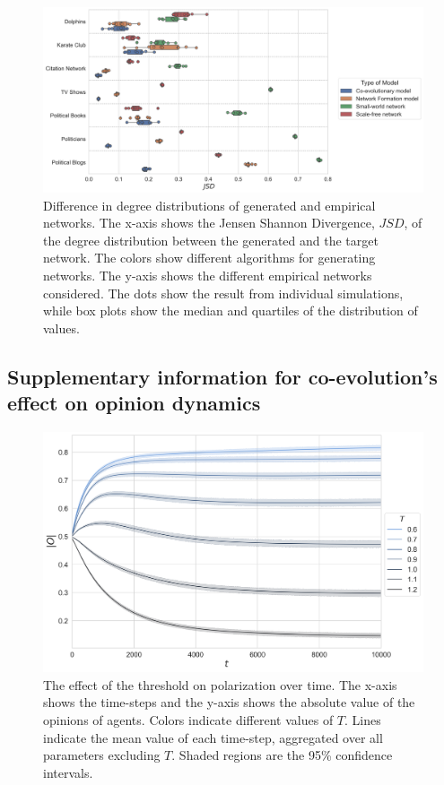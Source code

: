 \documentclass[11pt]{article}
\begin{document}
\begin{figure}[H]
    \centering
    \includegraphics[width=.9\linewidth]{../plots/overall/Model_Evaluation_JSD.png}
  \caption{Difference in degree distributions of generated and empirical networks. The x-axis shows the Jensen Shannon Divergence, $JSD$, of the degree distribution between the generated and the target network. The colors show different algorithms for generating networks. The y-axis shows the different empirical networks considered. The dots show the result from individual simulations, while box plots show the median and quartiles of the distribution of values.}
  \label{appendix:eval_divergence}
\end{figure}

\subsection{Supplementary information for co-evolution's effect on opinion dynamics}

\begin{figure}[H]
    \centering
    \includegraphics[width=.7\linewidth]{../plots/overall/Absolute_Opinion_Threshold.png}
  \caption{The effect of the threshold on polarization over time. The x-axis shows the time-steps and the y-axis shows the absolute value of the opinions of agents. Colors indicate different values of $T$. Lines indicate the mean value of each time-step, aggregated over all parameters excluding $T$. Shaded regions are the 95\% confidence intervals.}
  \label{appendix:threshold}
\end{figure}
\end{document}
